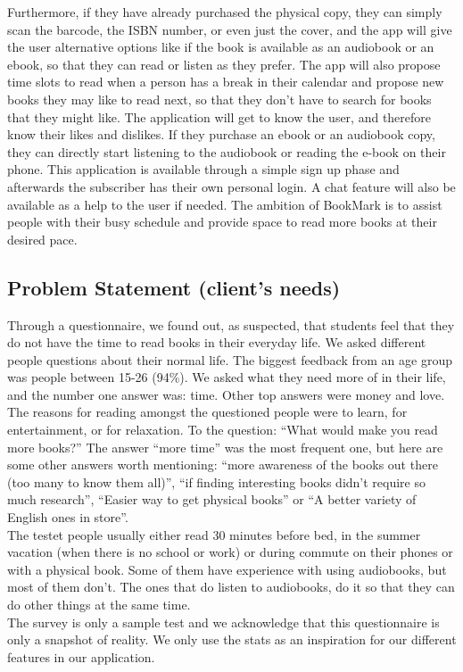 \documentclass[conference]{IEEEtran}
\begin{document}
Furthermore, if they have already purchased the physical copy, they can simply scan the barcode, the ISBN number, or even just the cover, and the app will give the user alternative options like if the book is available as an audiobook or an ebook, so that they can read or listen as they prefer. The app will also propose time slots to read when a person has a break in their calendar and propose new books they may like to read next, so that they don’t have to search for books that they might like. The application will get to know the user, and therefore know their likes and dislikes. If they purchase an ebook or an audiobook copy, they can directly start listening to the audiobook or reading the e-book on their phone. This application is available through a simple sign up phase and afterwards the subscriber has their own personal login. A chat feature will also be available as a help to the user if needed. The ambition of BookMark is to assist people with their busy schedule and provide space to read more books at their desired pace.

\subsection*{Problem Statement (client's needs)}
Through a questionnaire, we found out, as suspected, that students feel that they do not have the time to read books in their everyday life. We asked different people questions about their normal life. The biggest feedback from an age group was people between 15-26 (94\%). We asked what they need more of in their life, and the number one answer was: time. Other top answers were money and love.\\
The reasons for reading amongst the questioned people were to learn, for entertainment, or for relaxation. To the question: “What would make you read more books?” The answer “more time” was the most frequent one, but here are some other answers worth mentioning: “more awareness of the books out there (too many to know them all)”, “if finding interesting books didn’t require so much research”, “Easier way to get physical books” or “A better variety of English ones in store”.\\
The testet people usually either read 30 minutes before bed, in the summer vacation (when there is no school or work) or during commute on their phones or with a physical book. Some of them have experience with using audiobooks, but most of them don't. The ones that do listen to audiobooks, do it so that they can do other things at the same time.\\
The survey is only a sample test and we acknowledge that this questionnaire is only a snapshot of reality. We only use the stats as an inspiration for our different features in our application.
\end{document}
